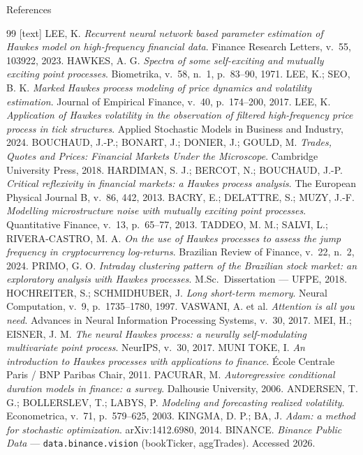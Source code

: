 \documentclass[aspectratio=169]{beamer}
\begin{document}
\begin{frame}[allowframebreaks]{References}
  \footnotesize
  \begin{thebibliography}{99}
    [text]
     LEE, K. \emph{Recurrent neural network based parameter estimation of Hawkes model on high-frequency financial data}. Finance Research Letters, v.\ 55, 103922, 2023.
     HAWKES, A. G. \emph{Spectra of some self-exciting and mutually exciting point processes}. Biometrika, v.\ 58, n.\ 1, p.\ 83--90, 1971.
     LEE, K.; SEO, B. K. \emph{Marked Hawkes process modeling of price dynamics and volatility estimation}. Journal of Empirical Finance, v.\ 40, p.\ 174--200, 2017.
     LEE, K. \emph{Application of Hawkes volatility in the observation of filtered high-frequency price process in tick structures}. Applied Stochastic Models in Business and Industry, 2024.
     BOUCHAUD, J.-P.; BONART, J.; DONIER, J.; GOULD, M. \emph{Trades, Quotes and Prices: Financial Markets Under the Microscope}. Cambridge University Press, 2018.
     HARDIMAN, S. J.; BERCOT, N.; BOUCHAUD, J.-P. \emph{Critical reflexivity in financial markets: a Hawkes process analysis}. The European Physical Journal B, v.\ 86, 442, 2013.
     BACRY, E.; DELATTRE, S.; MUZY, J.-F. \emph{Modelling microstructure noise with mutually exciting point processes}. Quantitative Finance, v.\ 13, p.\ 65--77, 2013.
     TADDEO, M. M.; SALVI, L.; RIVERA-CASTRO, M. A. \emph{On the use of Hawkes processes to assess the jump frequency in cryptocurrency log-returns}. Brazilian Review of Finance, v.\ 22, n.\ 2, 2024.
     PRIMO, G. O. \emph{Intraday clustering pattern of the Brazilian stock market: an exploratory analysis with Hawkes processes}. M.Sc.\ Dissertation --- UFPE, 2018.
     HOCHREITER, S.; SCHMIDHUBER, J. \emph{Long short-term memory}. Neural Computation, v.\ 9, p.\ 1735--1780, 1997.
     VASWANI, A. et al. \emph{Attention is all you need}. Advances in Neural Information Processing Systems, v.\ 30, 2017.
     MEI, H.; EISNER, J. M. \emph{The neural Hawkes process: a neurally self-modulating multivariate point process}. NeurIPS, v.\ 30, 2017.
     MUNI TOKE, I. \emph{An introduction to Hawkes processes with applications to finance}. École Centrale Paris / BNP Paribas Chair, 2011.
     PACURAR, M. \emph{Autoregressive conditional duration models in finance: a survey}. Dalhousie University, 2006.
     ANDERSEN, T. G.; BOLLERSLEV, T.; LABYS, P. \emph{Modeling and forecasting realized volatility}. Econometrica, v.\ 71, p.\ 579--625, 2003.
     KINGMA, D. P.; BA, J. \emph{Adam: a method for stochastic optimization}. arXiv:1412.6980, 2014.
     BINANCE. \emph{Binance Public Data} — \texttt{data.binance.vision} (bookTicker, aggTrades). Accessed 2026.
  \end{thebibliography}
\end{frame}
\end{document}
